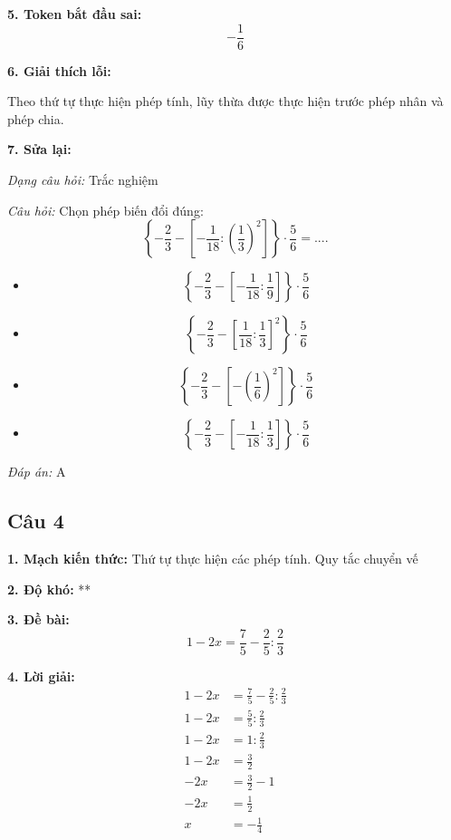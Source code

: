 \noindent\textbf{5. Token bắt đầu sai:}
\[
-\frac{1}{6}
\]


\noindent\textbf{6. Giải thích lỗi:}

Theo thứ tự thực hiện phép tính, lũy thừa được thực hiện trước phép nhân và phép chia.

\noindent\textbf{7. Sửa lại:}

\textit{Dạng câu hỏi:} Trắc nghiệm

\textit{Câu hỏi:} Chọn phép biến đổi đúng:
\[
\left\{
-\frac{2}{3}
-
\left[
-\frac{1}{18}:\left(\frac{1}{3}\right)^2
\right]
\right\}\cdot\frac{5}{6}=....
\]

\begin{itemize}
    \item[A.]
    \[\left\{-\frac{2}{3}-\left[-\frac{1}{18}:\frac{1}{9}\right] \right\}\cdot\frac{5}{6}\]

    \item[B.]\[\left\{ -\frac{2}{3} - \left[\frac{1}{18}:\frac{1}{3}\right]^2 \right\}\cdot\frac{5}{6}\]

    \item[C.]\[ \left\{-\frac{2}{3}-\left[-\left(\frac{1}{6}\right)^2\right]\right\}\cdot\frac{5}{6}  \]

    \item[D.]
    \[\left\{ -\frac{2}{3} -\left[-\frac{1}{18}:\frac{1}{3}\right]\right\}\cdot\frac{5}{6}\]
\end{itemize}

\textit{Đáp án:} A

\subsection*{Câu 4}

\noindent\textbf{1. Mạch kiến thức:} Thứ tự thực hiện các phép tính. Quy tắc chuyển vế

\noindent\textbf{2. Độ khó:} **

\noindent\textbf{3. Đề bài:}
\[
1-2x=\frac{7}{5}-\frac{2}{5}:\frac{2}{3}
\]

\noindent\textbf{4. Lời giải:}
\begin{align*}
1-2x
    &= \frac{7}{5}-\frac{2}{5}:\frac{2}{3} \\
1-2x
    &= \frac{5}{5}:\frac{2}{3} \\
1-2x
    &= 1:\frac{2}{3} \\
1-2x
    &= \frac{3}{2} \\
-2x
    &= \frac{3}{2}-1 \\
-2x
    &= \frac{1}{2} \\
x
    &= -\frac{1}{4}
\end{align*}

